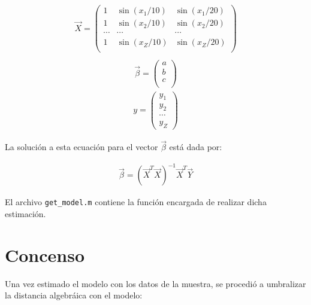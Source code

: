 \documentclass{IEEEtran}
\begin{document}
\begin{equation*}
\begin{aligned}
\vec{X} = 
\begin{pmatrix}
1 & \sin(x_1/10) & \sin(x_1/20) \\ 
1 & \sin(x_2/10) & \sin(x_2/20) \\ 
\cdots & \cdots &  \cdots \\
1 & \sin(x_Z/10) & \sin(x_Z/20) \\ 
 \end{pmatrix} \\
\end{aligned}
\end{equation*} 
\begin{equation*}
\begin{aligned}
\vec{\beta} = \left(
\begin{array}{c}
a \\ 
b \\
c \\
 \end{array}
 \right) 
\end{aligned}
\end{equation*} 
\begin{equation*}
\begin{aligned}
 y =
\left(
\begin{array}{c}
y_1 \\ 
y_2 \\
\cdots \\
y_Z 
 \end{array}
 \right) 
\end{aligned}
\end{equation*} 

La solución a esta ecuación para el vector $\vec{\beta}$ está dada por:

\begin{equation*}
\begin{aligned}
\vec{\beta} = (\vec{X}^T \vec{X})^{-1} \vec{X}^T \vec{Y}
\end{aligned}
\end{equation*} 

El archivo \verb+get_model.m+ contiene la función encargada de realizar dicha
estimación.

\section{Concenso}

Una vez estimado el modelo con los datos de la muestra,
se procedió a umbralizar la distancia algebráica
con el modelo:
\end{document}

